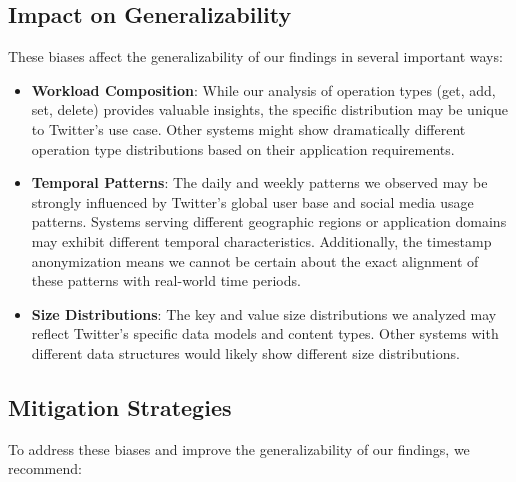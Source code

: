 \documentclass[conference]{IEEEtran}
\begin{document}
\subsection{Impact on Generalizability}

These biases affect the generalizability of our findings in several important ways:

\begin{itemize}
    \item \textbf{Workload Composition}: While our analysis of operation types (get, add, set, delete) provides valuable insights, the specific distribution may be unique to Twitter's use case. Other systems might show dramatically different operation type distributions based on their application requirements.
    
    \item \textbf{Temporal Patterns}: The daily and weekly patterns we observed may be strongly influenced by Twitter's global user base and social media usage patterns. Systems serving different geographic regions or application domains may exhibit different temporal characteristics. Additionally, the timestamp anonymization means we cannot be certain about the exact alignment of these patterns with real-world time periods.
    
    \item \textbf{Size Distributions}: The key and value size distributions we analyzed may reflect Twitter's specific data models and content types. Other systems with different data structures would likely show different size distributions.
\end{itemize}

\subsection{Mitigation Strategies}

To address these biases and improve the generalizability of our findings, we recommend:
\end{document}
